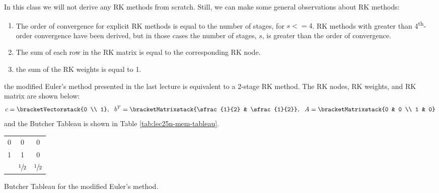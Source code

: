 In this class we will not derive any RK methods from scratch.  Still, we can make some general observations about RK methods:
\begin{enumerate}
\item The order of convergence for explicit RK methods is equal to the number of stages, for $s<=4$.  RK methods with greater than 4\textsuperscript{th}-order convergence have been derived, but in those cases the number of stages, $s$, is greater than the order of convergence.

\item The sum of each row in the RK matrix is equal to the corresponding RK node.
\item the sum of the RK weights is equal to 1.
\end{enumerate}

 the modified Euler's method presented in the last lecture is equivalent to a 2-stage RK method. The RK nodes, RK weights, and RK matrix are shown below:
\begin{equation*}
c = \bracketVectorstack{0 \\ 1}, \ \ b^{T} = \bracketMatrixstack{\sfrac{1}{2} & \sfrac{1}{2}}, \ \ A = \bracketMatrixstack{0 & 0 \\ 1 & 0}
\end{equation*}
and the Butcher Tableau is shown in Table \ref{tab:lec25n-mem-tableau}.
\begin{margintable}
\begin{tabular}{c|cc}
0 & 0 & 0 \\
1 & 1 & 0 \\ \hline
  & $\sfrac{1}{2}$ & $\sfrac{1}{2}$ \\
\end{tabular}
\caption{Butcher Tableau for the modified Euler's method.}
\label{tab:lec25n-mem-tableau}
\end{margintable}









